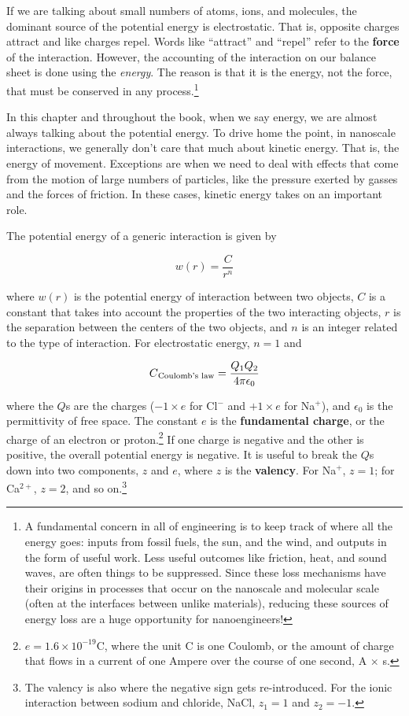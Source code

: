     If we are talking about small numbers of atoms, ions, and molecules, the dominant source of the potential energy is electrostatic. That is, opposite charges attract and like charges repel. Words like ``attract'' and ``repel'' refer to the \textbf{force} of the interaction. However, the accounting of the interaction on our balance sheet is done using the \textit{energy}. The reason is that it is the energy, not the force, that must be conserved in any process.\footnote{A fundamental concern in all of engineering is to keep track of where all the energy goes: inputs from fossil fuels, the sun, and the wind, and outputs in the form of useful work. Less useful outcomes like friction, heat, and sound waves, are often things to be suppressed. Since these loss mechanisms have their origins in processes that occur on the nanoscale and molecular scale (often at the interfaces between unlike materials), reducing these sources of energy loss are a huge opportunity for nanoengineers!}
    
    In this chapter and throughout the book, when we say energy, we are almost always talking about the potential energy. To drive home the point, in nanoscale interactions, we generally don’t care that much about kinetic energy. That is, the energy of movement. Exceptions are when we need to deal with effects that come from the motion of large numbers of particles, like the pressure exerted by gasses and the forces of friction. In these cases, kinetic energy takes on an important role. 

    The potential energy of a generic interaction is given by 

    \begin{equation}
        w(r)=\frac{C}{r^n}
    \end{equation}

    where $w(r)$ is the potential energy of interaction between two objects, $C$ is a constant that takes into account the properties of the two interacting objects, $r$ is the separation between the centers of the two objects, and $n$ is an integer related to the type of interaction. For electrostatic energy, $n=1$ and 

    \begin{equation}
    \label{coulomb}
        C\textsubscript{Coulomb's law}=\frac{Q\textsubscript{1}Q\textsubscript{2}}{4\pi\epsilon\textsubscript{0}}
    \end{equation}

    where the $Q$s are the charges ($-1 \times e$ for Cl$^{-}$ and $+1 \times e$ for Na$^+$), and $\epsilon_0$ is the permittivity of free space. The constant $e$ is the \textbf{fundamental charge}, or the charge of an electron or proton.\footnote{$e=1.6\times10^{-19}$C, where the unit C is one Coulomb, or the amount of charge that flows in a current of one Ampere over the course of one second, A $\times$ s.} If one charge is negative and the other is positive, the overall potential energy is negative. It is useful to break the $Q$s down into two components, $z$ and $e$, where $z$ is the \textbf{valency}. For Na$^+$, $z=1$; for Ca$^{2+}$, $z=2$, and so on.\footnote{The valency is also where the negative sign gets re-introduced. For the ionic interaction between sodium and chloride, NaCl, $z_1=1$ and $z_2=-1$.}

